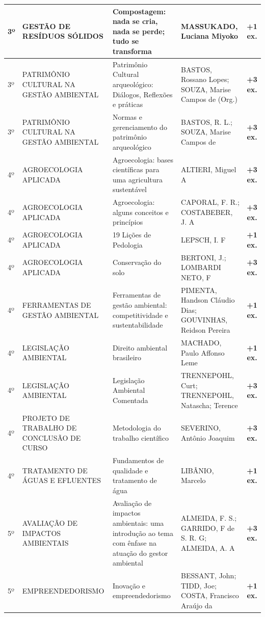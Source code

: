 \documentclass[11pt,a4paper]{article}
\begin{document}
\begin{longtable}{|p{1.2cm}|p{3.5cm}|p{6cm}|p{3.5cm}|c|}
3º & GESTÃO DE RESÍDUOS SÓLIDOS & Compostagem: nada se cria, nada se perde; tudo se transforma & MASSUKADO, Luciana Miyoko & \textbf{+1 ex.} \\ \hline
3º & PATRIMÔNIO CULTURAL NA GESTÃO AMBIENTAL & Patrimônio Cultural arqueológico: Diálogos, Reflexões e práticas & BASTOS, Rossano Lopes; SOUZA, Marise Campos de (Org.) & \textbf{+3 ex.} \\ \hline
3º & PATRIMÔNIO CULTURAL NA GESTÃO AMBIENTAL & Normas e gerenciamento do patrimônio arqueológico & BASTOS, R. L.; SOUZA, Marise Campos de & \textbf{+3 ex.} \\ \hline
4º & AGROECOLOGIA APLICADA & Agroecologia: bases científicas para uma agricultura sustentável & ALTIERI, Miguel A & \textbf{+3 ex.} \\ \hline
4º & AGROECOLOGIA APLICADA & Agroecologia: alguns conceitos e princípios & CAPORAL, F. R.; COSTABEBER, J. A & \textbf{+3 ex.} \\ \hline
4º & AGROECOLOGIA APLICADA & 19 Lições de Pedologia & LEPSCH, I. F & \textbf{+1 ex.} \\ \hline
4º & AGROECOLOGIA APLICADA & Conservação do solo & BERTONI, J.; LOMBARDI NETO, F & \textbf{+3 ex.} \\ \hline
4º & FERRAMENTAS DE GESTÃO AMBIENTAL & Ferramentas de gestão ambiental: competitividade e sustentabilidade & PIMENTA, Handson Cláudio Dias; GOUVINHAS, Reidson Pereira & \textbf{+1 ex.} \\ \hline
4º & LEGISLAÇÃO AMBIENTAL & Direito ambiental brasileiro & MACHADO, Paulo Affonso Leme & \textbf{+1 ex.} \\ \hline
4º & LEGISLAÇÃO AMBIENTAL & Legislação Ambiental Comentada & TRENNEPOHL, Curt; TRENNEPOHL, Natascha; Terence & \textbf{+3 ex.} \\ \hline
4º & PROJETO DE TRABALHO DE CONCLUSÃO DE CURSO & Metodologia do trabalho científico & SEVERINO, Antônio Joaquim & \textbf{+3 ex.} \\ \hline
4º & TRATAMENTO DE ÁGUAS E EFLUENTES & Fundamentos de qualidade e tratamento de água & LIBÂNIO, Marcelo & \textbf{+1 ex.} \\ \hline
5º & AVALIAÇÃO DE IMPACTOS AMBIENTAIS & Avaliação de impactos ambientais: uma introdução ao tema com ênfase na atuação do gestor ambiental & ALMEIDA, F. S.; GARRIDO, F de S. R. G; ALMEIDA, A. A & \textbf{+3 ex.} \\ \hline
5º & EMPREENDEDORISMO & Inovação e empreendedorismo & BESSANT, John; TIDD, Joe; COSTA, Francisco Araújo da & \textbf{+1 ex.} \\ \hline

\end{longtable}
\end{document}

